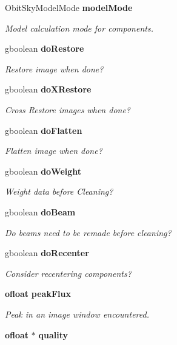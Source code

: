 \begin{CompactItemize}
Obit\-Sky\-Model\-Mode {\bf model\-Mode}
\begin{CompactList}\small\item\em Model calculation mode for components. \item\end{CompactList}\item 
gboolean {\bf do\-Restore}
\begin{CompactList}\small\item\em Restore image when done? \item\end{CompactList}\item 
gboolean {\bf do\-XRestore}
\begin{CompactList}\small\item\em Cross Restore images when done? \item\end{CompactList}\item 
gboolean {\bf do\-Flatten}
\begin{CompactList}\small\item\em Flatten image when done? \item\end{CompactList}\item 
gboolean {\bf do\-Weight}
\begin{CompactList}\small\item\em Weight data before Cleaning? \item\end{CompactList}\item 
gboolean {\bf do\-Beam}
\begin{CompactList}\small\item\em Do beams need to be remade before cleaning? \item\end{CompactList}\item 
gboolean {\bf do\-Recenter}
\begin{CompactList}\small\item\em Consider recentering components? \item\end{CompactList}\item 
{\bf ofloat} {\bf peak\-Flux}
\begin{CompactList}\small\item\em Peak in an image window encountered. \item\end{CompactList}\item 
{\bf ofloat} $\ast$ {\bf quality}

\end{CompactItemize}
